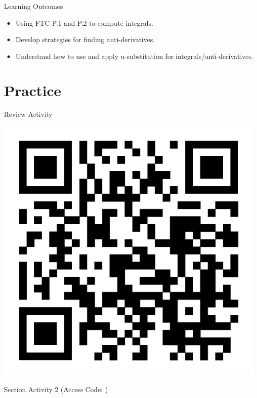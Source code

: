 \documentclass{beamer}
\begin{document}
\begin{frame}{Learning Outcomes}
    \begin{itemize}
        \item Using FTC P.1 and P.2 to compute integrals.
        \item Develop strategies for finding anti-derivatives.
        \item Understand how to use and apply u-substitution for integrals/anti-derivatives.
    \end{itemize}
\end{frame}

\section{Practice}
\begin{frame}{Review Activity}

    \includegraphics[width=.6\textwidth]{activity.png}


\end{frame}


\begin{frame}{Section Activity 2 (Access Code: )}
    
\end{frame}
\end{document}
